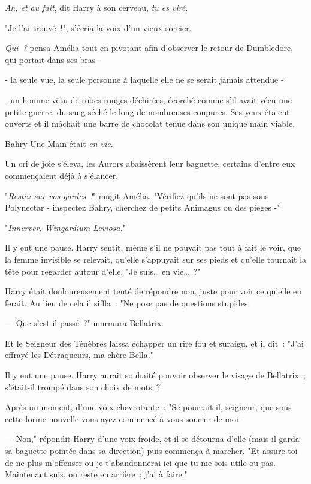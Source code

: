 \emph{Ah, et au fait}, dit Harry à son cerveau, \emph{tu es viré}.

\later

"Je l'ai trouvé~!", s'écria la voix d'un vieux sorcier.

\emph{Qui~?} pensa Amélia tout en pivotant afin d'observer le retour de Dumbledore, qui portait dans ses bras -

- la seule vue, la seule personne à laquelle elle ne se serait jamais attendue -

- un homme vêtu de robes rouges déchirées, écorché comme s'il avait vécu une petite guerre, du sang séché le long de nombreuses coupures. Ses yeux étaient ouverts et il mâchait une barre de chocolat tenue dans son unique main viable.

Bahry Une-Main était \emph{en vie}.

Un cri de joie s'éleva, les Aurors abaissèrent leur baguette, certains d'entre eux commençaient déjà à s'élancer.

"\emph{Restez sur vos gardes~!}" mugit Amélia. "Vérifiez qu'ils ne sont pas sous Polynectar - inspectez Bahry, cherchez de petits Animagus ou des pièges -"

\later

"\emph{Innerver. Wingardium Leviosa.}"

Il y eut une pause. Harry sentit, même s'il ne pouvait pas tout à fait le voir, que la femme invisible se relevait, qu'elle s'appuyait sur ses pieds et qu'elle tournait la tête pour regarder autour d'elle. "Je suis… en vie…~?"

Harry était douloureusement tenté de répondre non, juste pour voir ce qu'elle en ferait. Au lieu de cela il siffla~: "Ne pose pas de questions stupides.

--- Que s'est-il passé~?" murmura Bellatrix.

Et le Seigneur des Ténèbres laissa échapper un rire fou et suraigu, et il dit~: "J'ai effrayé les Détraqueurs, ma chère Bella."

Il y eut une pause. Harry aurait souhaité pouvoir observer le visage de Bellatrix~; s'était-il trompé dans son choix de mots~?

Après un moment, d'une voix chevrotante~: "Se pourrait-il, seigneur, que sous cette forme nouvelle vous ayez commencé à vous soucier de moi -

--- Non," répondit Harry d'une voix froide, et il se détourna d'elle (mais il garda sa baguette pointée dans sa direction) puis commença à marcher. "Et assure-toi de ne plus m'offenser ou je t'abandonnerai ici que tu me sois utile ou pas. Maintenant suis, ou reste en arrière~; j'ai à faire."

